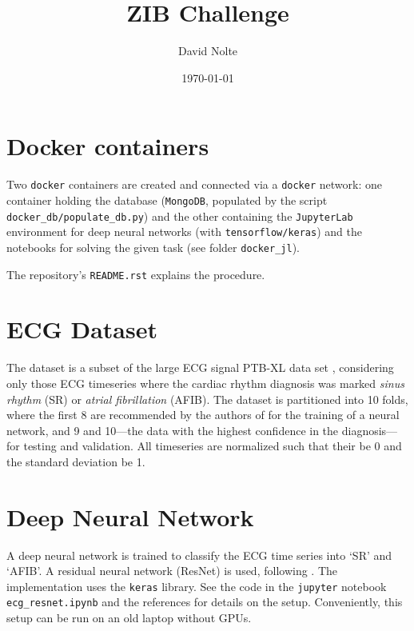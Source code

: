 \documentclass[11pt]{article}
\title{ZIB Challenge}
\author{David Nolte}
\date{\today}
\begin{document}
\maketitle

\section*{Docker containers}

Two \verb!docker! containers are created and connected via a \verb!docker!
network: one container holding the database (\verb!MongoDB!, populated by the
script \verb!docker_db/populate_db.py!) and the other containing the
\verb!JupyterLab!  environment for deep neural networks (with
\verb!tensorflow/keras!) and the notebooks for solving the given task (see
folder \verb!docker_jl!).

The repository's \verb!README.rst! explains the procedure.

\section*{ECG Dataset}
The dataset is a subset of the large ECG signal PTB-XL data
set \cite{wagner_ptb-xl_2020}, considering only
those ECG timeseries where the cardiac rhythm diagnosis was marked \emph{sinus
    rhythm} (SR) or \emph{atrial fibrillation} (AFIB).
The dataset is partitioned into 10 folds, where the first 8 are recommended
by the authors of \cite{wagner_ptb-xl_2020} for the training of a neural network, and 9 and 10---the
data with the highest confidence in the diagnosis---for testing and validation.
All timeseries are normalized such that their be 0 and the standard deviation be 1.

\section*{Deep Neural Network}
A deep neural network is trained to classify the ECG time series into `SR' and
`AFIB'. A residual neural network (ResNet) is used, following
\cite{kachuee_ecg_2018,spdrnl_ecg_2021}.
The implementation uses the \verb!keras! library.
See the code in the \verb!jupyter! notebook \verb!ecg_resnet.ipynb! and the
references \cite{kachuee_ecg_2018,spdrnl_ecg_2021} for details on the setup.
Conveniently, this setup can be run on an old laptop without GPUs.
\end{document}
